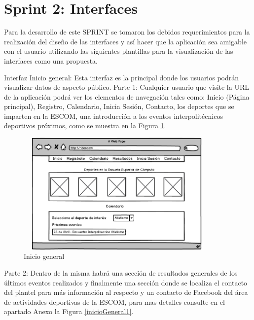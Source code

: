 	
	\section{Sprint 2: Interfaces}
	\noindent Para la desarrollo de este SPRINT se tomaron los debidos requerimientos para la realización del diseño de las interfaces y así hacer que la aplicación sea amigable con el usuario utilizando las siguientes plantillas para la visualización de las interfaces como una propuesta.
	\newline
	
	\noindent Interfaz Inicio general: Esta interfaz es la principal donde los usuarios podrán visualizar datos de aspecto público. 
	\newline
	Parte 1:
	Cualquier usuario que visite la URL de la aplicación podrá ver los elementos de navegación tales como: Inicio (Página principal), Registro, Calendario, Inicia Sesión, Contacto, los deportes que se imparten en la ESCOM, una introducción a los eventos interpolitécnicos deportivos próximos, como se muestra en la Figura \ref{inicioGeneral}. 
	\newline
	\begin{figure}[hbt!]
		\centering
		\includegraphics[width=10cm, height=6cm]{Imagenes/Disenos/Iniciogeneral}
		\caption{Inicio general}
		\label{inicioGeneral}
	\end{figure}
	
	Parte 2:
	Dentro de la misma habrá una sección de resultados generales de los últimos eventos realizados y finalmente una  sección donde se localiza el contacto del plantel para más información al respecto y un contacto de Facebook del área de actividades deportivas de la ESCOM, para mas detalles consulte en el apartado Anexo la Figura \ref{inicioGeneral1}.
	\pagebreak

